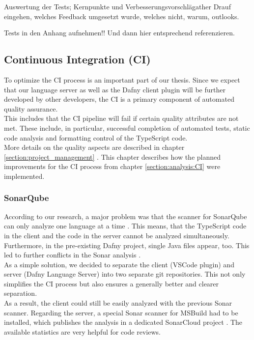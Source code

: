 Auswertung der Tests; Kernpunkte und Verbesserungsvorschlägather
Drauf eingehen, welches Feedback umgesetzt wurde, welches nicht, warum, outlooks.

Tests in den Anhang aufnehmen!! Und dann hier entsprechend referenzieren.

\subsection{Continuous Integration (CI)}
To optimize the CI process is an important part of our thesis.
Since we expect that our language server as well as the Dafny client plugin will be further developed by other developers,
the CI is a primary component of automated quality assurance. \\

This includes that the CI pipeline will fail if certain quality attributes are not met.
These include, in particular, successful completion of automated tests,
static code analysis and formatting control of the TypeScript code. \\

More details on the quality aspects are described in chapter \ref{section:project_management} .
This chapter describes how the planned improvements for the CI process from chapter \ref{section:analysis:CI} were implemented.

\subsubsection{SonarQube}
According to our research, a major problem was that the scanner for SonarQube can only analyze one language at a time \cite{sonar-supports-only-one-language}.
This means, that the TypeScript code in the client and the \CsharpWithSpace code in the server cannot be analyzed simultaneously.
Furthermore, in the pre-existing Dafny project, single Java files appear, too.
This led to further conflicts in the Sonar analysis \cite{sa}.\\

As a simple solution, we decided to separate the client (VSCode plugin) and server (Dafny Language Server) into two separate git repositories.
This not only simplifies the CI process but also ensures a generally better and clearer separation. \\

As a result, the client could still be easily analyzed with the previous Sonar scanner.
Regarding the server, a special Sonar scanner for MSBuild had to be installed, which publishes the analysis in a dedicated SonarCloud project \cite{dev}.
The available statistics are very helpful for code reviews.\\

